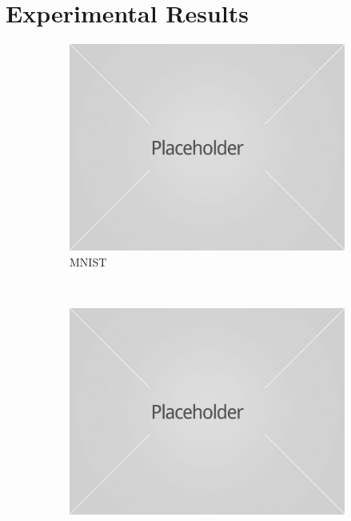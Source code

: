 \documentclass{article}
\begin{document}
\section{Experimental Results}

\begin{figure}
    \centering
    \begin{subfigure}[b]{0.3239\textwidth}
        \includegraphics[width=\textwidth]{placeholder1.jpg}
        \caption{MNIST}
    \end{subfigure}
    ~ %
    \begin{subfigure}[b]{0.3239\textwidth}
        \includegraphics[width=\textwidth]{placeholder1.jpg}

\end{subfigure}
\end{figure}
\end{document}
